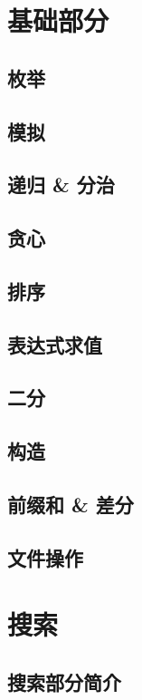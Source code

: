 \chapter{基础部分}

\section{枚举}

\section{模拟}

\section{递归 \& 分治}

\section{贪心}

\section{排序}

\section{表达式求值}

\section{二分}

\section{构造}

\section{前缀和 \& 差分}

\section{文件操作}

\chapter{搜索}
\section{搜索部分简介}

